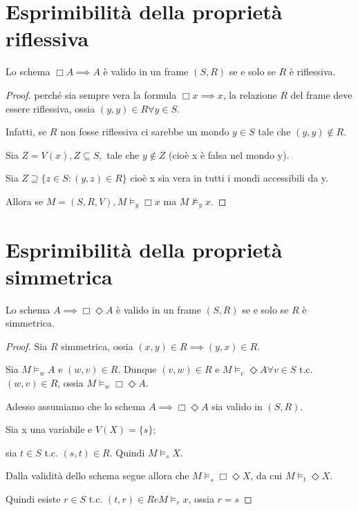 \documentclass[10pt,a4paper,twoside]{book}
\begin{document}
\section{Esprimibilità della proprietà riflessiva}
\begin{theorem}
    Lo schema $\Box A \implies A$ è valido in un frame $(S,R)$ se e solo se $R$ è riflessiva.
\end{theorem}
\begin{proof}
    perché sia sempre vera la formula $\Box x \implies x$, la relazione $R$ del frame deve essere riflessiva, ossia $(y,y) \in R \forall y \in S$.

    Infatti, se $R$ non fosse riflessiva ci sarebbe un mondo $y \in S$ tale che $(y,y) \notin R$.

    Sia $Z = V(x), Z \subseteq S,$ tale che $y \notin Z$ (cioè x è falsa nel mondo y).

    Sia $Z \supseteq \{z \in S : (y,z) \in R\}$ cioè x sia vera in tutti i mondi accessibili da y.

    Allora se $M = (S, R, V), M \vDash_y \Box x$ ma $M \nvDash_y x$.
\end{proof}
\newpage

\section{Esprimibilità della proprietà simmetrica}
\begin{theorem}
    Lo schema $ A \implies \Box \Diamond A$ è valido in un frame $(S,R)$ se e solo se $R$ è simmetrica.
\end{theorem}
\begin{proof}
    Sia $R$ simmetrica, ossia $(x,y) \in R \implies (y,x) \in R$.

    Sia $M \vDash_w A$ e $(w,v) \in R$. Dunque $(v,w) \in R$ e $M \vDash_v \Diamond A \forall v \in S$ t.c. $(w,v) \in R$, ossia $M \vDash_w \Box \Diamond A$.

    Adesso assumiamo che lo schema $A \implies \Box \Diamond A $ sia valido in $(S,R)$.

    Sia x una variabile e $V(X) = \{s\}$;

    sia $t \in S$ t.c. $(s,t) \in R$. Quindi $M \vDash_s X$.

    Dalla validità dello schema segue allora che $M \vDash_s \Box \Diamond X$, da cui $M \vDash_t \Diamond X$.

    Quindi esiste $r \in S$ t.c. $(t,r) \in R e M \vDash_r x$, ossia $r = s$
\end{proof}
\newpage
\end{document}

